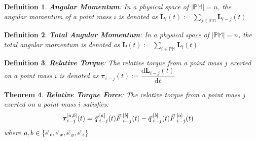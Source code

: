 \documentclass[12pt]{amsart}
\newtheorem{theorem}{Theorem}[section]
\newtheorem{definition}[theorem]{Definition}
\let\oldvec\vec
\renewcommand{\vec}[1]{\oldvec{#1}\hspace{0.1em}}
\begin{document}
\begin{definition}
\textbf{Angular Momentum}: In a physical space of $\left | \mathbb{PM} \right | = n$, the angular momentum of a point mass $i$ is denoted as $ \boldsymbol{L}_i(t) := \displaystyle \sum_{j \in \mathbb{PM}} \boldsymbol{L}_{i-j}(t) $ 
\end{definition}

\begin{definition}
\textbf{Total Angular Momentum}: In a physical space of $\left | \mathbb{PM} \right | = n$, the total angular momentum is denoted as $\boldsymbol{L}(t) := \displaystyle \sum_{i \in \mathbb{PM}} \boldsymbol{L}_{i} (t)$ 
\end{definition}


\begin{definition}
\textbf{Relative Torque}: The relative torque from a point mass $j$ exerted on a point mass $i$ is denoted as $ \boldsymbol{\tau}_{i-j} (t) := \dfrac{\mathrm{d} \boldsymbol{L}_{i-j}(t)}{\mathrm{d} t} $
\end{definition}

\begin{theorem}
    \textbf{Relative Torque Force}: The relative torque from a point mass $j$ exerted on a point mass $i$ satisfies: 
    $$\boldsymbol{\tau}_{i-j} ^{[a,b]} (t) = \vec{q}^{[a]}_{i-j} (t)\vec{F}^{[b]}_{i-j} (t) - \vec{q}^{[b]}_{i-j} (t) \vec{F}^{[a]}_{i-j} (t)$$
    where $a, b \in \{ \vec{e}_t, \vec{e}_x, \vec{e}_y, \vec{e}_z \}$
\end{theorem}
\end{document}

